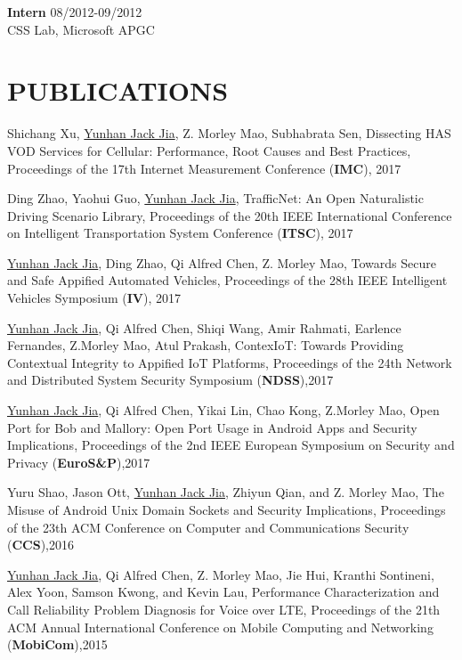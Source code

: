 \documentclass[margin]{res}
\begin{document}
\begin{resume}
\textbf{Intern} \hfill 08/2012-09/2012 \\
CSS Lab, Microsoft APGC


\section{PUBLICATIONS}

Shichang Xu, \underline{Yunhan Jack Jia}, Z. Morley Mao, Subhabrata Sen,
Dissecting HAS VOD Services for Cellular: Performance, Root Causes and Best Practices, Proceedings of the 17th Internet Measurement Conference (\textbf{IMC}), 2017

Ding Zhao, Yaohui Guo, \underline{Yunhan Jack Jia}, 
TrafficNet: An Open Naturalistic Driving Scenario Library, Proceedings of the 20th IEEE International Conference on Intelligent Transportation System Conference (\textbf{ITSC}), 2017 \href{http://web.eecs.umich.edu/\~jackjia/material/trafficnet\_itsc17.pdf}{\color{blue}{[PDF]}}

\underline{Yunhan Jack Jia}, Ding Zhao, Qi Alfred Chen, Z. Morley Mao,
Towards Secure and Safe Appified Automated Vehicles, Proceedings of the 28th IEEE Intelligent Vehicles Symposium (\textbf{IV}), 2017 \href{https://arxiv.org/pdf/1702.06827.pdf}{\color{blue}{[PDF]}}

\underline{Yunhan Jack Jia}, Qi Alfred Chen, Shiqi Wang, Amir Rahmati, Earlence Fernandes, Z.Morley Mao, Atul Prakash, 
ContexIoT: Towards Providing Contextual Integrity to Appified IoT Platforms, Proceedings of the 24th Network and Distributed System Security Symposium (\textbf{NDSS}),2017 \href{http://web.eecs.umich.edu/\~jackjia/material/contexiot\_ndss17.pdf}{\color{blue}{[PDF]}}

\underline{Yunhan Jack Jia}, Qi Alfred Chen, Yikai Lin, Chao Kong, Z.Morley Mao, 
Open Port for Bob and Mallory: Open Port Usage in Android Apps and Security Implications, Proceedings of the 2nd IEEE European Symposium on Security and Privacy (\textbf{EuroS\&P}),2017 \href{http://web.eecs.umich.edu/\~jackjia/material/open\_euro17.pdf}{\color{blue}{[PDF]}}

Yuru Shao, Jason Ott, \underline{Yunhan Jack Jia}, Zhiyun Qian, and Z. Morley Mao,
The Misuse of Android Unix Domain Sockets and Security Implications, Proceedings of the 23th ACM Conference on Computer and Communications Security (\textbf{CCS}),2016 \href{http://web.eecs.umich.edu/\~jackjia/material/misuse\_ccs16.pdf}{\color{blue}{[PDF]}}

\underline{Yunhan Jack Jia}, Qi Alfred Chen, Z. Morley Mao, Jie Hui, Kranthi Sontineni, Alex Yoon, Samson Kwong, and Kevin Lau, Performance Characterization and Call Reliability Problem Diagnosis for Voice over LTE, Proceedings of the 21th ACM Annual International Conference on Mobile Computing and Networking (\textbf{MobiCom}),2015 \href{http://web.eecs.umich.edu/\~jackjia/material/performance\_mobicom15.pdf}{\color{blue}{[PDF]}}


\end{resume}
\end{document}
